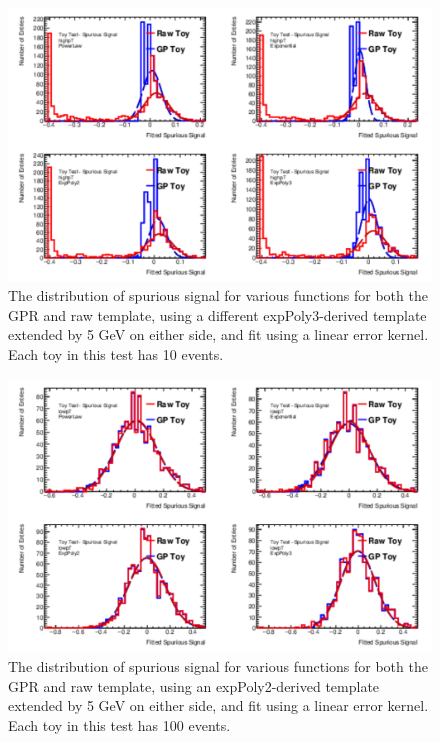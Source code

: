 \begin{figure} 
\begin{center}
  \includegraphics[width=\textwidth]{figures/background/gpr/validation/linear/ToyTest_FitSigVals_highpT_10_noSig}   
\caption{The distribution of spurious signal for various functions for both the GPR and raw template, using a different expPoly3-derived template extended by 5 GeV on either side, and fit using a linear error kernel. Each toy in this test has 10 events.}
\label{fig:linearkernel_highpt_10_noSig}
\end{center}
\end{figure}

\begin{figure} 
\begin{center}
  \includegraphics[width=\textwidth]{figures/background/gpr/validation/linear/ToyTest_FitSigVals_lowpT_100_noSig}   
\caption{The distribution of spurious signal for various functions for both the GPR and raw template, using an expPoly2-derived template extended by 5 GeV on either side, and fit using a linear error kernel. Each toy in this test has 100 events.}
\label{fig:linearkernel_lowpt_100_noSig}
\end{center}
\end{figure}

